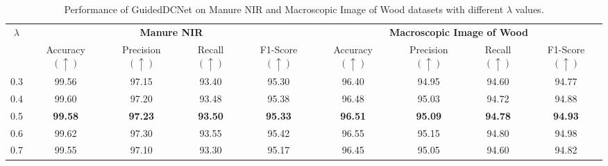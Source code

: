 \documentclass[a4paper,fleqn]{cas-sc}
\begin{document}
\begin{table}[htbp]
\centering
\caption{Performance of GuidedDCNet on Manure NIR and Macroscopic Image of Wood datasets with different $\lambda$ values.}
\label{tab8}
\begin{tabular}{c|cccc|cccc}
\hline
\multirow{2}{*}{$\lambda$} 
& \multicolumn{4}{c|}{\textbf{Manure NIR}} 
& \multicolumn{4}{c}{\textbf{Macroscopic Image of Wood}} \\ 
\cline{2-9}
& \makecell{Accuracy \\ \((\uparrow)\)} & \makecell{Precision \\ \((\uparrow)\)} & \makecell{Recall \\ \((\uparrow)\)} & \makecell{F1-Score \\ \((\uparrow)\)}
& \makecell{Accuracy \\ \((\uparrow)\)} & \makecell{Precision \\ \((\uparrow)\)} & \makecell{Recall \\ \((\uparrow)\)} & \makecell{F1-Score \\ \((\uparrow)\)} \\ 
\hline
0.3 & 99.56 & 97.15 & 93.40 & 95.30 
    & 96.40 & 94.95 & 94.60 & 94.77 \\
0.4 & 99.60 & 97.20 & 93.48 & 95.38 
    & 96.48 & 95.03 & 94.72 & 94.88 \\
0.5 & \textbf{99.58} & \textbf{97.23} & \textbf{93.50} & \textbf{95.33} 
    & \textbf{96.51} & \textbf{95.09} & \textbf{94.78} & \textbf{94.93} \\
0.6 & 99.62 & 97.30 & 93.55 & 95.42 
    & 96.55 & 95.15 & 94.80 & 94.98 \\
0.7 & 99.55 & 97.10 & 93.30 & 95.17 
    & 96.45 & 95.05 & 94.60 & 94.82 \\
\hline
\end{tabular}
\end{table}
\end{document}
